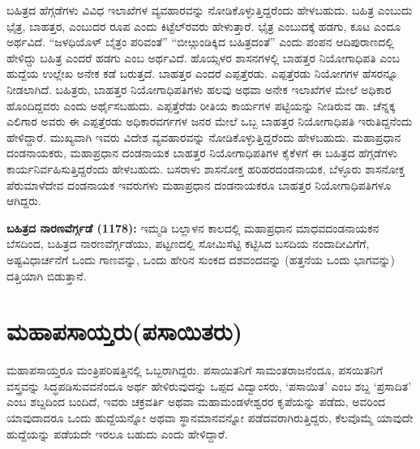 ಬಹಿತ್ರದ ಹೆಗ್ಗಡೆಗಳು ವಿವಿಧ ಇಲಾಖೆಗಳ ವ್ಯವಹಾರವನ್ನು ನೋಡಿಕೊಳ್ಳುತ್ತಿದ್ದರೆಂದು ಹೇಳಬಹುದು. ಬಹಿತ್ರ ಎಂಬುದು ಭೈತ್ರ, ಬಾಹತ್ತರ, ಎಂಬುದರ ರೂಪ ಎಂದು ಕಿಟ್ಟೆಲ್​ರವರು ಹೇಳುತ್ತಾರೆ. ಭೈತ್ರ ಎಂಬುದಕ್ಕೆ ಹಡಗು, ಕೂಟ ಎಂದೂ ಅರ್ಥವಿದೆ. “ಜಳಧಿಯೊಳ್​ ಬೈತ್ರಂ ಪರಿವಂತೆ” “ಬೀೞ್ಗುಂಡಿಕ್ಕಿದ ಬಹಿತ್ರದಂತೆ” ಎಂದು ಪಂಪನ ಆದಿಪುರಾಣದಲ್ಲಿ ಹೇಳಿದ್ದು ಬಹಿತ್ರ ಎಂದರೆ ಹಡಗು ಎಂಬ ಅರ್ಥವಿದೆ. ಹೊಯ್ಸಳರ ಶಾಸನಗಳಲ್ಲಿ ಬಾಹತ್ತರ ನಿಯೋಗಾಧಿಪತಿ ಎಂಬ ಹುದ್ದೆಯ ಉಲ್ಲೇಖ ಅನೇಕ ಕಡೆ ಬರುತ್ತದೆ. ಬಾಹತ್ತರ ಎಂದರೆ ಎಪ್ಪತ್ತೆರಡು. ಎಪ್ಪತ್ತೆರಡು ನಿಯೋಗಗಳ ಹೆಸರನ್ನೂ ನೀಡಲಾಗಿದೆ. ಬಹಿತ್ರರು, ಬಾಹತ್ತರ ನಿಯೋಗಾಧಿಪತಿಗಳು ಹಲವು ಅಥವಾ ಅನೇಕ ಇಲಾಖೆಗಳ ಮೇಲೆ ಅಧಿಕಾರ ಹೊಂದಿದ್ದವರು ಎಂದು ಅರ್ಥೈಸಬಹುದು. ಎಪ್ಪತ್ತೆರೆಡು ರೀತಿಯ ಕಾರ್ಯಗಳ ಪಟ್ಟಿಯನ್ನು ನೀಡಿರುವ ಡಾ. ಚೆನ್ನಕ್ಕ ಎಲಿಗಾರ ಅವರು ಈ ಎಪ್ಪತ್ತೆರಡು ಅಧಿಕಾರವರ್ಗಗಳ ಜನರ ಮೇಲೆ ಒಬ್ಬ ಬಾಹತ್ತರ ನಿಯೋಗಾಧಿಪತಿ ಇರುತಿದ್ದನೆಂದು ಹೇಳಿದ್ದಾರೆ. ಮುಖ್ಯವಾಗಿ ಇವರು ವಿದೇಶ ವ್ಯವಹಾರವನ್ನು ನೋಡಿಕೊಳ್ಳುತ್ತಿದ್ದರೆಂದು ಹೇಳಬಹುದು. ಮಹಾಪ್ರಧಾನ ದಂಡನಾಯಕರು, ಮಹಾಪ್ರಧಾನ ದಂಡನಾಯಕ ಬಾಹತ್ತರ ನಿಯೋಗಾಧಿಪತಿಗಳ ಕೈಕೆಳಗೆ ಈ ಬಹಿತ್ರದ ಹೆಗ್ಗಡೆಗಳು ಕಾರ್ಯನಿರ್ವಹಿಸುತ್ತಿದ್ದರೆಂದು ಹೇಳಬಹುದು. ಬಸರಾಳು ಶಾಸನೋಕ್ತ ಹರಿಹರದಂಡನಾಯಕ, ಬೆಳ್ಳೂರು ಶಾಸನೋಕ್ತ ಪೆರುಮಾಳೆದೇವ ದಂಡನಾಯಕ ಇವರುಗಳು ಮಹಾಪ್ರಧಾನ ದಂಡನಾಯಕರೂ ಬಾಹತ್ತರ ನಿಯೋಗಾಧಿಪತಿಗಳೂ ಆಗಿದ್ದರು.

\textbf{ಬಹಿತ್ರದ ನಾರಣವೆರ್ಗ್ಗಡೆ (1178):} ಇಮ್ಮಡಿ ಬಲ್ಲಾಳನ ಕಾಲದಲ್ಲಿ ಮಹಾಪ್ರಧಾನ ಮಾಧವದಂಡನಾಯಕನ ಬೆಸದಿಂದ, ಬಹಿತ್ರದ ನಾರಣವೆರ್ಗ್ಗಡೆಯು, ಪಟ್ಟಣದಲ್ಲಿ ಸೋಮಿಸೆಟ್ಟಿ ಕಟ್ಟಿಸಿದ ಬಸದಿಯ ನಂದಾದೀವಿಗೆಗೆ, ಅಷ್ಟ\-ವಿಧಾರ್ಚನೆಗೆ ಒಂದು ಗಾಣವನ್ನು, ಒಂದು ಹೇರಿನ ಸುಂಕದ ದಶವಂದವನ್ನು (ಹತ್ತನೆಯ ಒಂದು ಭಾಗವನ್ನು) ದತ್ತಿಯಾಗಿ ಬಿಡುತ್ತಾನೆ.


\section*{ಮಹಾಪಸಾಯ್ತರು(ಪಸಾಯಿತರು)}

ಮಹಾಪಸಾಯ್ತರೂ ಮಂತ್ರಿಪರಿಷತ್ತಿನಲ್ಲಿ ಒಬ್ಬರಾಗಿದ್ದರು. ಪಸಾಯಿತನಿಗೆ ಸಾಮಂತರಾಜನೆಂದೂ, ಪಸಯಿತನಿಗೆ ವಸ್ತ್ರವನ್ನು ಸಿದ್ಧಪಡಿಸುವವನೆಂದೂ ಅರ್ಥ ಹೇಳಿರುವುದನ್ನು ಒಪ್ಪದ ವಿದ್ವಾಂಸರು, ‘ಪಸಾಯಿತ’ ಎಂಬ ಶಬ್ದ ‘ಪ್ರಸಾದಿತ’ ಎಂಬ ಶಬ್ದದಿಂದ ಬಂದಿದೆ, ಇವರು ಚಕ್ರವರ್ತಿ ಅಥವಾ ಮಹಾಮಂಡಳೇಶ್ವರರ ಕೃಪೆಯನ್ನು ಪಡೆದು, ಅವರಿಂದ ಯಾವುದಾದರೂ ಒಂದು ಹುದ್ದೆಯನ್ನೋ ಅಥವಾ ಸ್ಥಾನಮಾನವನ್ನೋ ಪಡೆದವರಾಗಿರುತ್ತಿದ್ದರು, ಕೆಲವೊಮ್ಮೆ ಯಾವುದೇ ಹುದ್ದೆಯನ್ನು ಪಡೆಯದೇ \hbox{ಇರಲೂ} ಬಹುದು ಎಂದು ಹೇಳಿದ್ದಾರೆ.

